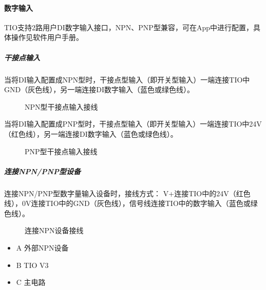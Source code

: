 \documentclass[a4paper,11pt,english,openany,oneside]{sphinxmanual}
\begin{document}
\paragraph{数字输入}
\label{\detokenize{08 _u5b89_u88c5_u4e0e_u8c03_u8bd5:id36}}\label{\detokenize{08 _u5b89_u88c5_u4e0e_u8c03_u8bd5:id37}}
\sphinxAtStartPar
TIO支持2路用户DI数字输入接口，NPN、PNP型兼容，可在App中进行配置，具体操作见软件用户手册。


\subparagraph{干接点输入}
\label{\detokenize{08 _u5b89_u88c5_u4e0e_u8c03_u8bd5:id38}}
\sphinxAtStartPar
当将DI输入配置成NPN型时，干接点型输入（即开关型输入）一端连接TIO中GND（灰色线），另一端连接DI数字输入（蓝色或绿色线）。

\begin{figure}[H]
\centering
\capstart

\noindent{}
\caption{NPN型干接点输入接线}\label{\detokenize{08 _u5b89_u88c5_u4e0e_u8c03_u8bd5:id100}}\end{figure}



\sphinxAtStartPar
当将DI输入配置成PNP型时，干接点型输入（即开关型输入）一端连接TIO中24V（红色线），另一端连接DI数字输入（蓝色或绿色线）。

\begin{figure}[H]
\centering
\capstart

\noindent{}
\caption{PNP型干接点输入接线}\label{\detokenize{08 _u5b89_u88c5_u4e0e_u8c03_u8bd5:id101}}\end{figure}




\subparagraph{连接NPN/PNP型设备}
\label{\detokenize{08 _u5b89_u88c5_u4e0e_u8c03_u8bd5:npn-pnp}}
\sphinxAtStartPar
连接NPN/PNP型数字量输入设备时，接线方式：
V+连接TIO中的24V（红色线），0V连接TIO中的GND（灰色线），信号线连接TIO中的数字输入（蓝色或绿色线）。

\begin{figure}[H]
\centering
\capstart

\noindent{}
\caption{连接NPN设备接线}\label{\detokenize{08 _u5b89_u88c5_u4e0e_u8c03_u8bd5:id102}}\end{figure}


\begin{itemize}
\item {} 
\sphinxAtStartPar
A 外部NPN设备

\item {} 
\sphinxAtStartPar
B TIO V3

\item {} 
\sphinxAtStartPar
C 主电路

\end{itemize}
\end{document}
